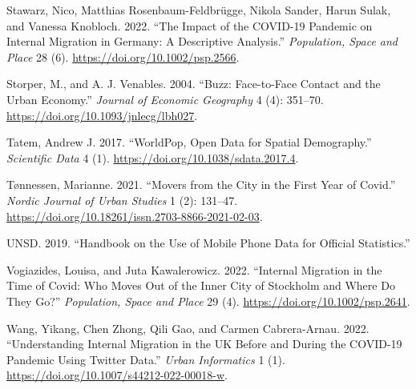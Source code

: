 \documentclass[
  11pt,
]{article}
\newlength{\cslhangindent}
\newlength{\cslentryspacingunit} %
\newenvironment{CSLReferences}[2] %
 {%
  \setlength{\parindent}{0pt}
  \ifodd #1
  \let\oldpar\par
  \def\par{\hangindent=\cslhangindent\oldpar}
  \fi
  \setlength{\parskip}{#2\cslentryspacingunit}
 }%
 {}
\begin{document}
\begin{CSLReferences}{1}{0}
\leavevmode{}%
Stawarz, Nico, Matthias Rosenbaum-Feldbrügge, Nikola Sander, Harun
Sulak, and Vanessa Knobloch. 2022. {``The Impact of the COVID{-}19
Pandemic on Internal Migration in Germany: A Descriptive Analysis.''}
\emph{Population, Space and Place} 28 (6).
\url{https://doi.org/10.1002/psp.2566}.

\leavevmode{}%
Storper, M., and A. J. Venables. 2004. {``Buzz: Face-to-Face Contact and
the Urban Economy.''} \emph{Journal of Economic Geography} 4 (4):
351--70. \url{https://doi.org/10.1093/jnlecg/lbh027}.

\leavevmode{}%
Tatem, Andrew J. 2017. {``WorldPop, Open Data for Spatial Demography.''}
\emph{Scientific Data} 4 (1).
\url{https://doi.org/10.1038/sdata.2017.4}.

\leavevmode{}%
Tønnessen, Marianne. 2021. {``Movers from the City in the First Year of
Covid.''} \emph{Nordic Journal of Urban Studies} 1 (2): 131--47.
\url{https://doi.org/10.18261/issn.2703-8866-2021-02-03}.

\leavevmode{}%
UNSD. 2019. {``Handbook on the Use of Mobile Phone Data for Official
Statistics.''}

\leavevmode{}%
Vogiazides, Louisa, and Juta Kawalerowicz. 2022. {``Internal Migration
in the Time of Covid: Who Moves Out of the Inner City of Stockholm and
Where Do They Go?''} \emph{Population, Space and Place} 29 (4).
\url{https://doi.org/10.1002/psp.2641}.

\leavevmode{}%
Wang, Yikang, Chen Zhong, Qili Gao, and Carmen Cabrera-Arnau. 2022.
{``Understanding Internal Migration in the UK Before and During the
COVID-19 Pandemic Using Twitter Data.''} \emph{Urban Informatics} 1 (1).
\url{https://doi.org/10.1007/s44212-022-00018-w}.

\end{CSLReferences}
\end{document}
